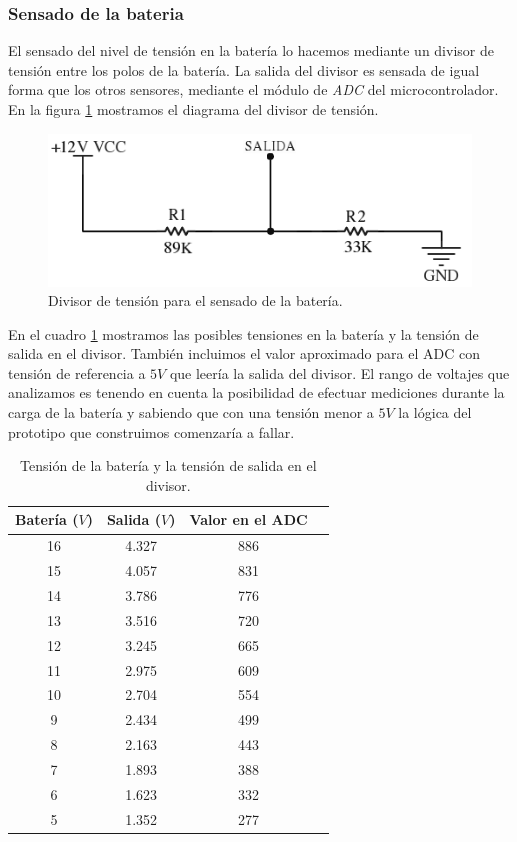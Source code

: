 \subsubsection{Sensado de la bateria}
\label{h_sensado_bateria}

El sensado del nivel de tensi\'on en la bater\'ia lo hacemos mediante un divisor de tensi\'on entre los polos de la bater\'ia.
La salida del divisor es sensada de igual forma que los otros sensores, mediante el m\'odulo de \emph{ADC} del microcontrolador.
En la figura \ref{hF_bateria_diagrama} mostramos el diagrama del divisor de tensi\'on.

\begin{figure}[h]
	\centering
	\includegraphics[scale=0.35]{figuras/bateria.png}
	\caption{Divisor de tensi\'on para el sensado de la bater\'ia.}
	\label{hF_bateria_diagrama}
\end{figure}

En el cuadro \ref{hT_bateria_divT} mostramos las posibles tensiones en la bater\'ia y la tensi\'on de salida en el divisor.
Tambi\'en incluimos el valor aproximado para el ADC con tensi\'on de referencia a $5V$ que leer\'ia la salida del divisor.
El rango de voltajes que analizamos es tenendo en cuenta la posibilidad de efectuar mediciones durante la carga de la bater\'ia
y sabiendo que con una tensi\'on menor a $5 V$ la l\'ogica del prototipo que construimos comenzar\'ia a fallar.

\begin{table}[h]
	\begin{center}
		\begin{tabular}{|c|c|c|c|}
			\hline
			Bater\'ia ($V$) & Salida ($V$) & Valor en el ADC \\
			\hline
			16 & 4.327 & 886 \\
			15 & 4.057 & 831 \\
			14 & 3.786 & 776 \\
			13 & 3.516 & 720 \\
			12 & 3.245 & 665 \\
			11 & 2.975 & 609 \\
			10 & 2.704 & 554 \\
			 9 & 2.434 & 499 \\
			 8 & 2.163 & 443 \\
			 7 & 1.893 & 388 \\
			 6 & 1.623 & 332 \\
			 5 & 1.352 & 277 \\
			\hline
		\end{tabular}
	\end{center}
	\caption{Tensi\'on de la bater\'ia y la tensi\'on de salida en el divisor.}
	\label{hT_bateria_divT}
\end{table}

